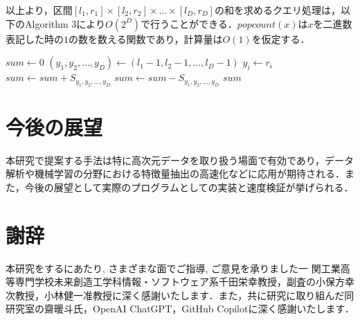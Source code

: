 \documentclass[12pt]{jsreport}
\theoremstyle{plain} %
\theoremstyle{definition}
\begin{document}
以上より，区間$[l_1, r_1] \times [l_2, r_2] \times \ldots \times [l_D, r_D]$の和を求めるクエリ処理は，以下のAlgorithm 3により$O(2^D)$で行うことができる．$popcount(x)$は$x$を二進数表記した時の$1$の数を数える関数であり，計算量は$O(1)$を仮定する．
\begin{algorithm}
    \caption{多次元累積和のクエリ処理}
    \begin{algorithmic}[1]
                \STATE {}
        \STATE $sum \leftarrow 0$
            \STATE $(y_1, y_2, \dots, y_D) \leftarrow (l_1-1, l_2-1, \dots, l_D-1)$
                    \STATE $y_i \leftarrow r_i$
                \ENDIF
            \ENDFOR
            \STATE {}
                \STATE $sum \leftarrow sum + S_{y_1, y_2, \dots, y_D}$
            \ELSE
                \STATE $sum \leftarrow sum - S_{y_1, y_2, \dots, y_D}$
            \ENDIF
        \ENDFOR
        \RETURN $sum$

    \end{algorithmic}
\end{algorithm}

\chapter{今後の展望}

本研究で提案する手法は特に高次元データを取り扱う場面で有効であり，データ解析や機械学習の分野における特徴量抽出の高速化などに応用が期待される．また，今後の展望として実際のプログラムとしての実装と速度検証が挙げられる．

\chapter*{謝辞}
本研究をするにあたり, さまざまな面でご指導, ご意見を承りました一
関工業高等専門学校未来創造工学科情報・ソフトウェア系千田栄幸教授，副査の小保方幸次教授，小林健一准教授に深く感謝いたします．また，共に研究に取り組んだ同研究室の齋暖斗氏，OpenAI ChatGPT，GitHub Copilotに深く感謝いたします．
\end{document}
